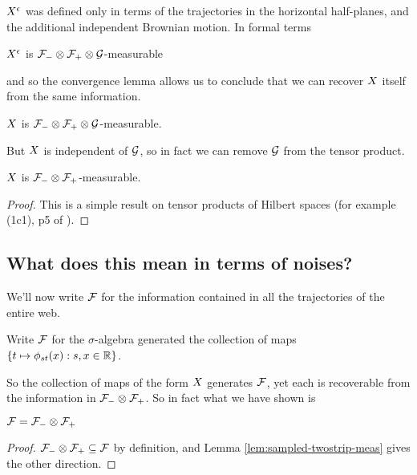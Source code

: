 {$X^{\epsilon}$ was defined only in terms of the trajectories in the
horizontal half-planes, and the additional independent Brownian
motion.  In formal terms

\begin{obs}
  $X^{\epsilon}$ is $\mathcal{F}_{-} \otimes \mathcal{F}_{+} \otimes \mathcal{G}$-measurable
\end{obs}

and so the convergence lemma allows us to conclude that we can
recover $X$ itself from the same information.

\begin{cor}
  \label{cor:sampled-twostripsreservoir-meas}
  $X$ is $\mathcal{F}_{-} \otimes \mathcal{F}_{+} \otimes \mathcal{G}$-measurable.
\end{cor}
  
But $X$ is independent of $\mathcal{G}$, so in fact we can
remove $\mathcal{G}$ from the tensor product.

\begin{lemma}
  \label{lem:sampled-twostrip-meas}
  $X$ is $\mathcal{F}_{-} \otimes \mathcal{F}_{+}$-measurable.
\end{lemma}

\begin{proof}
  This is a simple result on tensor products of
  Hilbert spaces (for example (1c1), p5 of
  \cite{tsirelson-completion}).
\end{proof}

\subsection{What does this mean in terms of noises?}

We'll now write $\mathcal{F}$ for the information contained in all the
trajectories of the entire web.

\begin{definition}
  Write $\mathcal{F}$ for the $\sigma$-algebra generated the
  collection of maps $\{ t \mapsto \phi_{{s}{t}}(x) : s,x \in \mathbb{R} \}$.
\end{definition}

So the collection of maps of the form $X$ generates
$\mathcal{F}$, yet each is recoverable from the information in
$\mathcal{F}_{-} \otimes \mathcal{F}_{+}$.  So in fact what we have shown is

\begin{theorem}
  $\mathcal{F} = \mathcal{F}_{-} \otimes \mathcal{F}_{+}$
\end{theorem}

\begin{proof}
  $\mathcal{F}_{-} \otimes \mathcal{F}_{+} \subseteq \mathcal{F}$ by definition, and Lemma
  \ref{lem:sampled-twostrip-meas} gives the other direction.
\end{proof}
}
